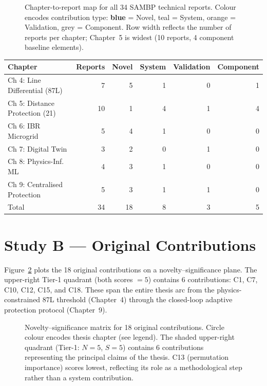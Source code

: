 \documentclass[11pt,a4paper]{article}
\begin{document}
\begin{figure}[htbp]
  \centering
  \resizebox{0.98\textwidth}{!}{}
  \caption{Chapter-to-report map for all 34 SAMBP technical reports.
           Colour encodes contribution type: \textbf{blue} = Novel,
           teal = System, orange = Validation, grey = Component.
           Row width reflects the number of reports per chapter;
           Chapter~5 is widest (10 reports, 4 component baseline elements).}
  \label{fig:chaptermap}
\end{figure}

\begin{center}
\begin{tabular}{@{}lrrrrr@{}}
\toprule
Chapter & Reports & Novel & System & Validation & Component \\
\midrule
Ch 4: Line Differential (87L) & 7 & 5 & 1 & 0 & 1 \\
Ch 5: Distance Protection (21) & 10 & 1 & 4 & 1 & 4 \\
Ch 6: IBR Microgrid            & 5 & 4 & 1 & 0 & 0 \\
Ch 7: Digital Twin             & 3 & 2 & 0 & 1 & 0 \\
Ch 8: Physics-Inf. ML          & 4 & 3 & 1 & 0 & 0 \\
Ch 9: Centralised Protection   & 5 & 3 & 1 & 1 & 0 \\
\midrule
Total & 34 & 18 & 8 & 3 & 5 \\
\bottomrule
\end{tabular}
\end{center}

\section{Study B --- Original Contributions}
\label{sec:studyB}

Figure~\ref{fig:contribmatrix} plots the 18 original contributions on
a novelty--significance plane.  The upper-right Tier-1 quadrant (both
scores $= 5$) contains 6 contributions: C1, C7, C10, C12, C15, and C18.
These span the entire thesis arc from the physics-constrained 87L
threshold (Chapter~4) through the closed-loop adaptive protection
protocol (Chapter~9).

\begin{figure}[htbp]
  \centering
  \resizebox{0.80\textwidth}{!}{}
  \caption{Novelty--significance matrix for 18 original contributions.
           Circle colour encodes thesis chapter (see legend).
           The shaded upper-right quadrant (Tier-1: $N=5$, $S=5$) contains
           6 contributions representing the principal claims of the thesis.
           C13 (permutation importance) scores lowest, reflecting its
           role as a methodological step rather than a system contribution.}
  \label{fig:contribmatrix}
\end{figure}
\end{document}
